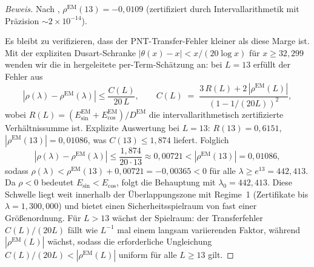 ﻿\documentclass[12pt,a4paper]{article}
\theoremstyle{definition}
\theoremstyle{remark}
\begin{document}
\begin{proof}[Beweis]
Nach , $\rho^{\mathrm{EM}}(13) = -0{,}0109$ (zertifiziert durch Intervallarithmetik mit Präzision $\sim 2 \times 10^{-14}$).

Es bleibt zu verifizieren, dass der PNT-Transfer-Fehler kleiner als diese Marge ist. Mit der expliziten Dusart-Schranke \cite{Dusart2010} $|\theta(x) - x| < x/(20\log x)$ für $x \geq 32{,}299$ wenden wir die in  hergeleitete per-Term-Schätzung an: bei $L = 13$ erfüllt der Fehler aus 
\[
  |\rho(\lambda) - \rho^{\mathrm{EM}}(\lambda)| \leq \frac{C(L)}{20\,L}, \qquad C(L) \;=\; \frac{3\,R(L) + 2\,|\rho^{\mathrm{EM}}(L)|}{(1 - 1/(20L))^2},
\]
wobei $R(L) = (E_{\sin}^{\mathrm{EM}} + E_{\cos}^{\mathrm{EM}}) / D^{\mathrm{EM}}$ die intervallarithmetisch zertifizierte Verhältnissumme ist. Explizite Auswertung bei $L = 13$: $R(13) = 0{,}6151$, $|\rho^{\mathrm{EM}}(13)| = 0{,}01086$, was $C(13) \leq 1{,}874$ liefert. Folglich
\[
  |\rho(\lambda) - \rho^{\mathrm{EM}}(\lambda)| \leq \frac{1{,}874}{20 \cdot 13} \approx 0{,}00721 < |\rho^{\mathrm{EM}}(13)| = 0{,}01086,
\]
sodass $\rho(\lambda) < \rho^{\mathrm{EM}}(13) + 0{,}00721 = -0{,}00365 < 0$ für alle $\lambda \geq e^{13} = 442{,}413$. Da $\rho < 0$ bedeutet $E_{\sin} < E_{\cos}$, folgt die Behauptung mit $\lambda_0 = 442{,}413$. Diese Schwelle liegt weit innerhalb der Überlappungszone mit Regime~1 (Zertifikate bis $\lambda = 1{,}300{,}000$) und bietet einen Sicherheitsspielraum von fast einer Größenordnung. Für $L > 13$ wächst der Spielraum: der Transferfehler $C(L)/(20L)$ fällt wie $L^{-1}$ mal einem langsam variierenden Faktor, während $|\rho^{\mathrm{EM}}(L)|$ wächst, sodass die erforderliche Ungleichung $C(L)/(20L) < |\rho^{\mathrm{EM}}(L)|$ uniform für alle $L \geq 13$ gilt.
\end{proof}
\end{document}
